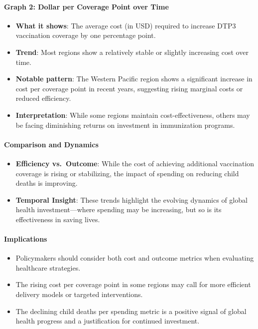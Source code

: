 \documentclass[
]{article}
\providecommand{\tightlist}{%
  \setlength{\itemsep}{0pt}\setlength{\parskip}{0pt}}
\begin{document}
\paragraph{Graph 2: Dollar per Coverage Point over
Time}\label{graph-2-dollar-per-coverage-point-over-time}

\begin{itemize}
\tightlist
\item
  \textbf{What it shows}: The average cost (in USD) required to increase
  DTP3 vaccination coverage by one percentage point.
\item
  \textbf{Trend}: Most regions show a relatively stable or slightly
  increasing cost over time.
\item
  \textbf{Notable pattern}: The Western Pacific region shows a
  significant increase in cost per coverage point in recent years,
  suggesting rising marginal costs or reduced efficiency.
\item
  \textbf{Interpretation}: While some regions maintain
  cost-effectiveness, others may be facing diminishing returns on
  investment in immunization programs.
\end{itemize}

\paragraph{Comparison and Dynamics}\label{comparison-and-dynamics}

\begin{itemize}
\tightlist
\item
  \textbf{Efficiency vs.~Outcome}: While the cost of achieving
  additional vaccination coverage is rising or stabilizing, the impact
  of spending on reducing child deaths is improving.
\item
  \textbf{Temporal Insight}: These trends highlight the evolving
  dynamics of global health investment---where spending may be
  increasing, but so is its effectiveness in saving lives.
\end{itemize}

\paragraph{Implications}\label{implications}

\begin{itemize}
\tightlist
\item
  Policymakers should consider both cost and outcome metrics when
  evaluating healthcare strategies.
\item
  The rising cost per coverage point in some regions may call for more
  efficient delivery models or targeted interventions.
\item
  The declining child deaths per spending metric is a positive signal of
  global health progress and a justification for continued investment.
\end{itemize}
\end{document}
